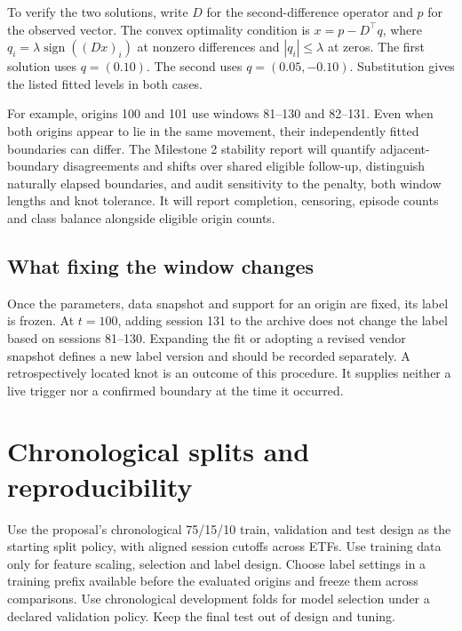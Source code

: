 \documentclass[10pt,letterpaper]{article}
\begin{document}
To verify the two solutions, write \(D\) for the second-difference operator and \(p\) for the observed vector. The convex optimality condition is \(x=p-D^\top q\), where \(q_i=\lambda\operatorname{sign}((Dx)_i)\) at nonzero differences and \(|q_i|\le\lambda\) at zeros. The first solution uses \(q=(0.10)\). The second uses \(q=(0.05,-0.10)\). Substitution gives the listed fitted levels in both cases.\par

For example, origins 100 and 101 use windows 81--130 and 82--131. Even when both origins appear to lie in the same movement, their independently fitted boundaries can differ. The Milestone 2 stability report will quantify adjacent-boundary disagreements and shifts over shared eligible follow-up, distinguish naturally elapsed boundaries, and audit sensitivity to the penalty, both window lengths and knot tolerance. It will report completion, censoring, episode counts and class balance alongside eligible origin counts.\par

\subsection*{What fixing the window changes}

Once the parameters, data snapshot and support for an origin are fixed, its label is frozen. At \(t=100\), adding session 131 to the archive does not change the label based on sessions 81--130. Expanding the fit or adopting a revised vendor snapshot defines a new label version and should be recorded separately. A retrospectively located knot is an outcome of this procedure. It supplies neither a live trigger nor a confirmed boundary at the time it occurred.\par

\clearpage

\section{Chronological splits and reproducibility}

Use the proposal's chronological 75/15/10 train, validation and test design as the starting split policy, with aligned session cutoffs across ETFs. Use training data only for feature scaling, selection and label design. Choose label settings in a training prefix available before the evaluated origins and freeze them across comparisons. Use chronological development folds for model selection under a declared validation policy. Keep the final test out of design and tuning.\par
\end{document}

